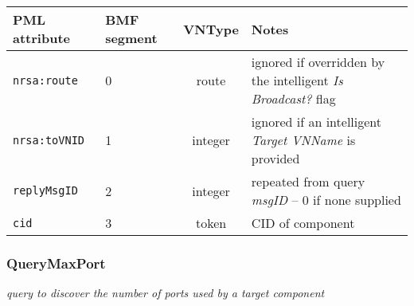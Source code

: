 \documentclass[pdftex,a4paper]{article}
\newcommand{\XMLfont}[1]{{\tt \small #1}}
\begin{document}
\begin{table}[!h]
  \begin{center}
    \label{tab:ReplyCID}
    \begin{tabular}{|l|p{13mm}|c|p{60mm}|}
      \hline

      \textbf{PML attribute} & \textbf{BMF segment} & \textbf{VNType}
      & \textbf{Notes} \\\hline

      \XMLfont{nrsa:route} & 0 & route & ignored if overridden by the
      intelligent {\em Is Broadcast?} flag \\ \hline

      \XMLfont{nrsa:toVNID} & 1 & integer & ignored if an intelligent {\em
      Target VNName} is provided \\\hline

      \XMLfont{replyMsgID} & 2 & integer & repeated from query {\em
      msgID} -- 0 if none supplied \\\hline


      \XMLfont{cid} & 3 & token & CID of component \\\hline

    \end{tabular}
  \end{center}
\end{table}

\clearpage

\subsubsection{QueryMaxPort}
{\em query to discover the number of ports used by a target component}
\end{document}
